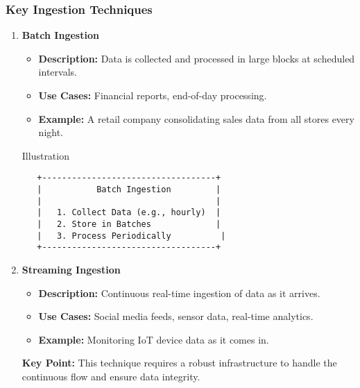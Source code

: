 \documentclass[aspectratio=169]{beamer}
\begin{document}
\begin{frame}[fragile]
  \frametitle{Key Ingestion Techniques}
  \begin{enumerate}
    \item \textbf{Batch Ingestion}
      \begin{itemize}
        \item \textbf{Description:} Data is collected and processed in large blocks at scheduled intervals.
        \item \textbf{Use Cases:} Financial reports, end-of-day processing.
        \item \textbf{Example:} A retail company consolidating sales data from all stores every night.
      \end{itemize}
      \begin{block}{Illustration}
      \begin{verbatim}
   +-----------------------------------+
   |           Batch Ingestion         |
   |                                   |
   |   1. Collect Data (e.g., hourly)  |
   |   2. Store in Batches             |
   |   3. Process Periodically          |
   +-----------------------------------+
      \end{verbatim}
      \end{block}
      
    \item \textbf{Streaming Ingestion}
      \begin{itemize}
        \item \textbf{Description:} Continuous real-time ingestion of data as it arrives.
        \item \textbf{Use Cases:} Social media feeds, sensor data, real-time analytics.
        \item \textbf{Example:} Monitoring IoT device data as it comes in.
      \end{itemize}
      \textbf{Key Point:} This technique requires a robust infrastructure to handle the continuous flow and ensure data integrity.
\end{enumerate}
\end{frame}
\end{document}
